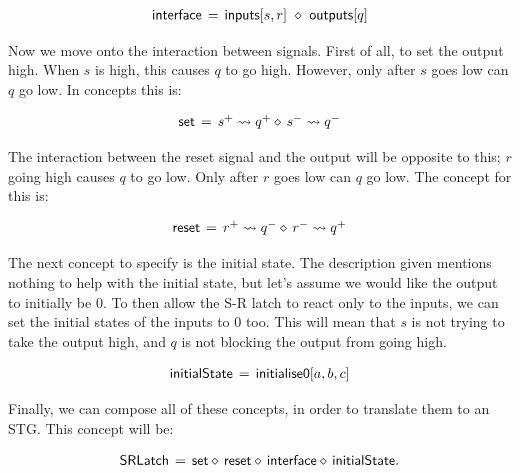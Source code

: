 \documentclass[british, journal]{IEEEtran}
\begin{document}
\[
\begin{array}{lcl}
\mathsf{interface}&\hspace{-2mm}=&\hspace{-2mm}\mathsf{inputs}[s, r]~\diamond~\mathsf{outputs}[q]
\end{array}
\]

Now we move onto the interaction between signals. First of all, to set the output high.
When $s$ is high, this causes $q$ to go high. However, only after $s$ goes low can $q$ go low.
In concepts this is: 

\[
\begin{array}{lcl}
\mathsf{set}&\hspace{-2mm}=&\hspace{-2mm}s^{+} \rightsquigarrow q^{+} \diamond\, s^{-} \rightsquigarrow q^{-}
\end{array}
\]

The interaction between the reset signal and the output will be opposite to this; $r$ going high causes $q$ 
to go low. Only after $r$ goes low can $q$ go low. The concept for this is:

\[
\begin{array}{lcl}
\mathsf{reset}&\hspace{-2mm}=&\hspace{-2mm}r^{+} \rightsquigarrow q^{-} \diamond\, r^{-} \rightsquigarrow q^{+}
\end{array}
\]

The next concept to specify is the initial state. The description given mentions nothing
to help with the initial state, but let's assume we would like the output to initially be 0. 
To then allow the S-R latch to react only to the inputs, we can set the initial states of the 
inputs to 0 too. This will mean that $s$ is not trying to take the output high, and $q$ is not
blocking the output from going high. 

\[
\begin{array}{lcl}
\mathsf{initialState}&\hspace{-2mm}=&\hspace{-2mm}\mathsf{initialise0} [a, b, c]
\end{array}
\]

Finally, we can compose all of these concepts, in order to translate them to an STG. This concept will be:

\[
\begin{array}{lcl}
\mathsf{SRLatch}&\hspace{-2mm}=&\hspace{-2mm}\mathsf{set} \diamond\, \mathsf{reset} \diamond\, \mathsf{interface} 
\diamond\, \mathsf{initialState}.
\end{array}
\]
\end{document}
